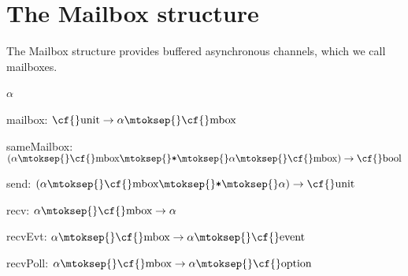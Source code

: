 \maybeclearpage
\section{The {\cf Mailbox} structure}


The {\cf \small Mailbox} structure provides buffered asynchronous channels, which we call mailboxes. 
\begin{synopsis}
\item {} \label{sig-MAILBOX}
\item {\STRUCTURE} \label{str-Mailbox}
\end{synopsis}

\begin{interface}
\Nopagebreak
\item {}{} \(\alpha\)~
\Nopagebreak
\item {}{} {\cf mailbox: \(\mbox{\cf{}unit}\rightarrow \alpha\mtoksep{}\mbox{\cf{}mbox}\)}

\Nopagebreak
\item {}{} {\cf sameMailbox: \((\alpha\mtoksep{}\mbox{\cf{}mbox}\mtoksep{}\verb,*,\mtoksep{}\alpha\mtoksep{}\mbox{\cf{}mbox})\rightarrow \mbox{\cf{}bool}\)}

\Nopagebreak
\item {}{} {\cf send: \((\alpha\mtoksep{}\mbox{\cf{}mbox}\mtoksep{}\verb,*,\mtoksep{}\alpha)\rightarrow \mbox{\cf{}unit}\)}

\Nopagebreak
\item {}{} {\cf recv: \(\alpha\mtoksep{}\mbox{\cf{}mbox}\rightarrow \alpha\)}

\Nopagebreak
\item {}{} {\cf recvEvt: \(\alpha\mtoksep{}\mbox{\cf{}mbox}\rightarrow \alpha\mtoksep{}\mbox{\cf{}event}\)}

\Nopagebreak
\item {}{} {\cf recvPoll: \(\alpha\mtoksep{}\mbox{\cf{}mbox}\rightarrow \alpha\mtoksep{}\mbox{\cf{}option}\)}

\end{interface}


